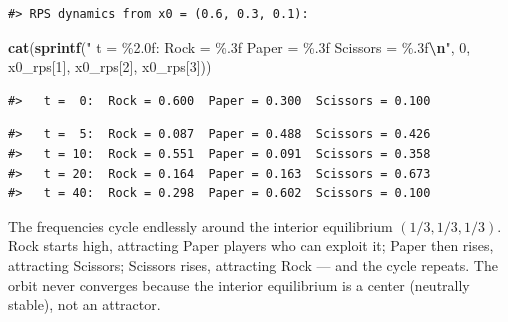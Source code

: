 \documentclass[
]{article}
\newenvironment{Shaded}{\begin{snugshade}}{\end{snugshade}}
\newcommand{\ControlFlowTok}[1]{\textcolor[rgb]{0.13,0.29,0.53}{\textbf{#1}}}
\newcommand{\DecValTok}[1]{\textcolor[rgb]{0.00,0.00,0.81}{#1}}
\newcommand{\FunctionTok}[1]{\textcolor[rgb]{0.13,0.29,0.53}{\textbf{#1}}}
\newcommand{\NormalTok}[1]{#1}
\newcommand{\OtherTok}[1]{\textcolor[rgb]{0.56,0.35,0.01}{#1}}
\newcommand{\SpecialCharTok}[1]{\textcolor[rgb]{0.81,0.36,0.00}{\textbf{#1}}}
\newcommand{\StringTok}[1]{\textcolor[rgb]{0.31,0.60,0.02}{#1}}
\begin{document}
\begin{verbatim}
#> RPS dynamics from x0 = (0.6, 0.3, 0.1):
\end{verbatim}

\begin{Shaded}
\begin{Highlighting}[]
\FunctionTok{cat}\NormalTok{(}\FunctionTok{sprintf}\NormalTok{(}\StringTok{"  t = \%2.0f:  Rock = \%.3f  Paper = \%.3f  Scissors = \%.3f}\SpecialCharTok{\textbackslash{}n}\StringTok{"}\NormalTok{,}
            \DecValTok{0}\NormalTok{, x0\_rps[}\DecValTok{1}\NormalTok{], x0\_rps[}\DecValTok{2}\NormalTok{], x0\_rps[}\DecValTok{3}\NormalTok{]))}
\end{Highlighting}
\end{Shaded}

\begin{verbatim}
#>   t =  0:  Rock = 0.600  Paper = 0.300  Scissors = 0.100
\end{verbatim}

\begin{Shaded}
\end{Shaded}

\begin{verbatim}
#>   t =  5:  Rock = 0.087  Paper = 0.488  Scissors = 0.426
#>   t = 10:  Rock = 0.551  Paper = 0.091  Scissors = 0.358
#>   t = 20:  Rock = 0.164  Paper = 0.163  Scissors = 0.673
#>   t = 40:  Rock = 0.298  Paper = 0.602  Scissors = 0.100
\end{verbatim}

The frequencies cycle endlessly around the interior equilibrium
\((1/3, 1/3, 1/3)\). Rock starts high, attracting Paper players who can
exploit it; Paper then rises, attracting Scissors; Scissors rises,
attracting Rock --- and the cycle repeats. The orbit never converges
because the interior equilibrium is a center (neutrally stable), not an
attractor.
\end{document}

